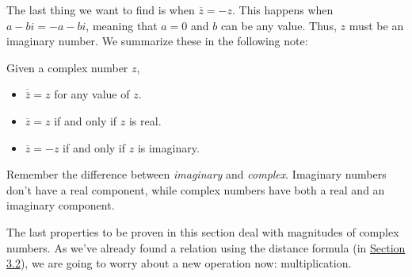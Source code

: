 \documentclass[lang=en,11pt]{elegantbook}
\begin{document}
The last thing we want to find is when $\overline{z}=-z$.  This happens when $a-bi=-a-bi$, meaning that $a=0$ and $b$ can be any value.  Thus, $z$ must be an imaginary number.  We summarize these in the following note:
\begin{note}
Given a complex number $z$, \begin{itemize}
    \item $\overline{\overline{z}}=z$ for any value of $z$.
    \item $\overline{z}=z$ if and only if $z$ is real.
    \item $\overline{z}=-z$ if and only if $z$ is imaginary.
\end{itemize}
\end{note}
\noindent Remember the difference between \textit{imaginary} and \textit{complex}.  Imaginary numbers don't have a real component, while complex numbers have both a real and an imaginary component.

The last properties to be proven in this section deal with magnitudes of complex numbers.  As we've already found a relation using the distance formula (in \hyperlink{section.3.2}{Section 3.2}), we are going to worry about a new operation now: multiplication.
\end{document}
